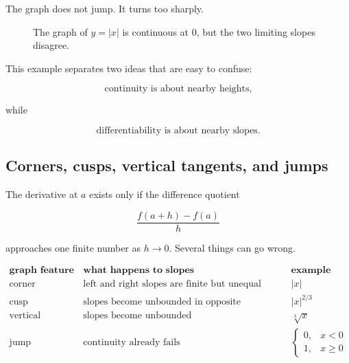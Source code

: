 The graph does not jump.  It turns too sharply.

\begin{figure}[h]
\centering
{}
\caption{The graph of \(y=|x|\) is continuous at \(0\), but the two limiting slopes disagree.}
\label{fig:absolute-value-continuous-not-differentiable}
\end{figure}

This example separates two ideas that are easy to confuse:

\[
\text{continuity is about nearby heights,}
\]

while

\[
\text{differentiability is about nearby slopes.}
\]

\subsection{Corners, cusps, vertical tangents, and jumps}
\label{subsec:ways-differentiability-can-fail}

The derivative at \(a\) exists only if the difference quotient

\[
\frac{f(a+h)-f(a)}{h}
\]

approaches one finite number as \(h\to0\).  Several things can go wrong.

\[
\begin{array}{c|l|l}
\textbf{graph feature} & \textbf{what happens to slopes} & \textbf{example} \\ \hline
\text{corner} & \text{left and right slopes are finite but unequal} & |x| \\[2pt]
\text{cusp} & \text{slopes become unbounded in opposite directions} & |x|^{2/3} \\[2pt]
\text{vertical tangent} & \text{slopes become unbounded} & \sqrt[3]{x} \\[2pt]
\text{jump} & \text{continuity already fails} &
\begin{cases}
0,&x<0\\
1,&x\ge0
\end{cases}
\end{array}
\]

